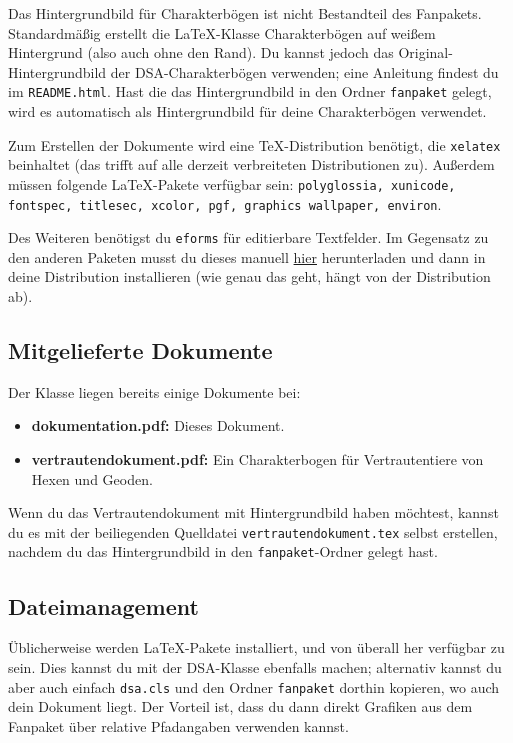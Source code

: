 \documentclass{dsa}
\begin{document}
   Das Hintergrundbild für Charakterbögen ist nicht Bestandteil des Fanpakets.
   Standardmäßig erstellt die \LaTeX-Klasse Charakterbögen auf weißem Hintergrund
   (also auch ohne den Rand). Du kannst jedoch das Original-Hintergrundbild der
   DSA-Charakterbögen verwenden; eine Anleitung findest du im
   \texttt{README.html}. Hast die das Hintergrundbild in den Ordner 
   \texttt{fanpaket} gelegt, wird es automatisch als Hintergrundbild für deine
   Charakterbögen verwendet.
   
   Zum Erstellen der Dokumente wird eine TeX-Distribution benötigt, die
   \texttt{xelatex} beinhaltet (das trifft auf alle derzeit verbreiteten
   Distributionen zu). Außerdem müssen folgende LaTeX-Pakete verfügbar sein:
   \texttt{polyglossia, xunicode, fontspec, titlesec, xcolor, pgf, graphics
    wallpaper, environ}.
   
   Des Weiteren benötigst du \texttt{eforms} für editierbare Textfelder.
   Im Gegensatz zu den anderen Paketen musst du dieses manuell
   \href{http://www.ctan.org/pkg/eforms}{hier} herunterladen und dann in deine
   Distribution installieren (wie genau das geht, hängt von der Distribution ab).
   
   \subsection*{Mitgelieferte Dokumente}
   
   Der Klasse liegen bereits einige Dokumente bei:
   
   \begin{itemize}
      \item \textbf{dokumentation.pdf:} Dieses Dokument.
      \item \textbf{vertrautendokument.pdf:} Ein Charakterbogen für
            Vertrautentiere von Hexen und Geoden.
   \end{itemize}
   
   Wenn du das Vertrautendokument mit Hintergrundbild haben möchtest, kannst du
   es mit der beiliegenden Quelldatei \texttt{vertrautendokument.tex} selbst
   erstellen, nachdem du das Hintergrundbild in den \texttt{fanpaket}-Ordner
   gelegt hast.
   
   \subsection*{Dateimanagement}
   
   Üblicherweise werden \LaTeX-Pakete installiert, und von überall her
   verfügbar zu sein. Dies kannst du mit der DSA-Klasse ebenfalls machen;
   alternativ kannst du aber auch einfach \texttt{dsa.cls} und den Ordner
   \texttt{fanpaket} dorthin kopieren, wo auch dein Dokument liegt. Der
   Vorteil ist, dass du dann direkt Grafiken aus dem Fanpaket über relative
   Pfadangaben verwenden kannst.
   
\end{document}
